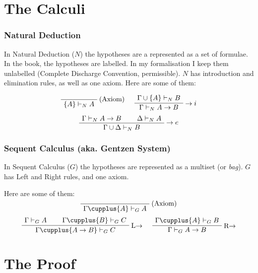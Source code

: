\documentclass[english,svgnames,hide notes,12pt]{beamer}
\theoremstyle{definition}
\theoremstyle{remark}
\begin{document}
\section{The Calculi}

\begin{frame}
    \frametitle{Natural Deduction}
    In Natural Deduction ($N$) the hypotheses are a represented as a set of formulae. In the book, the hypotheses are labelled. In my formalisation I keep them unlabelled (Complete Discharge Convention, permissible). $N$ has introduction and elimination rules, as well as one axiom. Here are some of them:


    \[
        \AxiomC{}
        \RightLabel{(Axiom)}
        \UnaryInfC{$\{A\} \vdash_N A$}
        \DisplayProof
        \hspace{0.5cm}
        \AxiomC{$\Gamma\cup\{A\} \vdash_N B$}
        \RightLabel{$\to i$}
        \UnaryInfC{$\Gamma\vdash_N A\to B$}
        \DisplayProof
    \]
    \[
        \AxiomC{$\Gamma\vdash_N A\to B$}
        \AxiomC{$\Delta\vdash_N A$}
        \RightLabel{$\to e$}
        \BinaryInfC{$\Gamma\cup\Delta\vdash_N B$}
        \DisplayProof
    \]
\end{frame}


\begin{frame}
    \frametitle{Sequent Calculus (aka. Gentzen System)}
    In Sequent Calculus ($G$) the hypotheses are represented as a multiset (or \emph{bag}). $G$ has Left and Right rules, and one axiom.

    Here are some of them:
    \[
        \AxiomC{}
        \RightLabel{(Axiom)}
        \UnaryInfC{$\Gamma \cupplus \{A\}\vdash_G A$}
        \DisplayProof
    \]
    \[
        \AxiomC{$\Gamma\vdash_G A$}
        \AxiomC{$\Gamma\cupplus\{B\}\vdash_G C$}
        \RightLabel{L$\to$}
        \BinaryInfC{$\Gamma\cupplus\{A\to B\}\vdash_G C$}
        \DisplayProof
        \hspace{0.5cm}
        \AxiomC{$\Gamma\cupplus\{A\}\vdash_G B$}
        \RightLabel{R$\to$}
        \UnaryInfC{$\Gamma\vdash_G A\to B$}
        \DisplayProof
    \]
\end{frame}

\section{The Proof}
\end{document}
